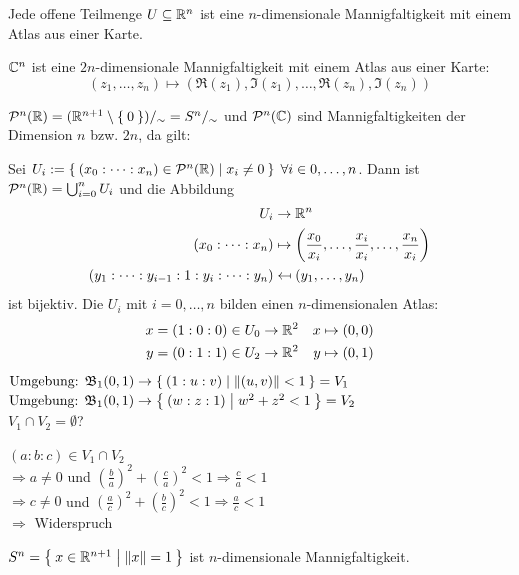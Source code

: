 \begin{beispiel}
    \begin{bspenum}
        \item Jede offene Teilmenge $U \subseteq \mathbb{R}^n$ ist eine 
              $n$-dimensionale Mannigfaltigkeit mit einem Atlas aus 
              einer Karte.
        \item $\mathbb{C}^n$ ist eine $2n$-dimensionale Mannigfaltigkeit
              mit einem Atlas aus einer Karte:
              \[(z_1, \dots, z_n) \mapsto (\Re(z_1), \Im(z_1), \dots, \Re(z_n), \Im(z_n))\]
        \item {}$\mathcal{P}^n(\mathbb{R}) = (\mathbb{R}^{n+1} \setminus \Set{0})/_\sim = S^n /_\sim$ und $\mathcal{P}^n(\mathbb{C})$ sind Mannigfaltigkeiten
              der Dimension $n$ bzw. $2n$, da gilt:

              Sei $U_i := \Set{(x_0: \dots : x_n) \in \ensuremath{\mathcal{P}}^n(\ensuremath{\mathbb{R}}) | x_i \neq 0}\;\forall i \in 0, \dots, n$.
              Dann ist $\mathcal{P}^n(\mathbb{R}) = \bigcup_{i=0}^n U_i$ und die Abbildung
              \begin{align*}
                U_i &\rightarrow \mdr^n\\
                (x_0 : \dots : x_n) &\mapsto \left (\frac{x_0}{x_i}, \dots, \frac{x_i}{x_i}, \dots, \frac{x_n}{x_i} \right )\\
                (y_1 : \dots : y_{i-1} : 1 : y_i : \dots : y_n) &\mapsfrom (y_1, \dots, y_n)
              \end{align*}
              ist bijektiv.
              Die $U_i$ mit $i = 0, \dots, n$ bilden einen $n$-dimensionalen Atlas:
              \begin{align*}
                      x &= (1:0:0) \in U_0 \rightarrow \mathbb{R}^2 & x &\mapsto (0,0)\\
                      y &= (0:1:1) \in U_2 \rightarrow \mathbb{R}^2 & y &\mapsto (0,1)
              \end{align*}
              $\text{Umgebung: } \mathfrak{B}_1 (0,1) \rightarrow \Set{(1:u:v) | \|(u,v)\| < 1} = V_1$\\
              $\text{Umgebung: } \mathfrak{B}_1 (0,1) \rightarrow \Set{(w:z:1) | w^2 + z^2 < 1} = V_2$\\

              $V_1 \cap V_2 = \emptyset$?

              $(a:b:c) \in V_1 \cap V_2$\\
              $\Rightarrow a \neq 0$ und $(\frac{b}{a})^2 + (\frac{c}{a})^2 < 1 \Rightarrow \frac{c}{a} < 1$\\
              $\Rightarrow c \neq 0$ und $(\frac{a}{c})^2 + (\frac{b}{c})^2 < 1 \Rightarrow \frac{a}{c} < 1$\\
              $\Rightarrow$ Widerspruch
        \item $S^n = \Set{x \in \ensuremath{\mathbb{R}}^{n+1} | \|x\| = 1}$ ist $n$-dimensionale
              Mannigfaltigkeit.


\end{bspenum}
\end{beispiel}
